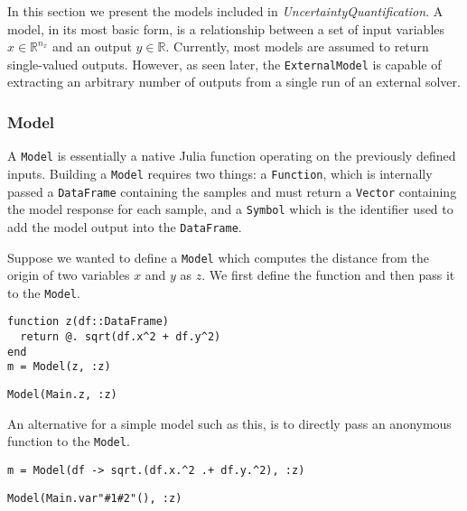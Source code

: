 In this section we present the models included in \emph{UncertaintyQuantification}. A model, in its most basic form, is a relationship between a set of input variables \(x \in \mathbb{R}^{n_x}\) and an output \(y \in \mathbb{R}\). Currently, most models are assumed to return single-valued outputs. However, as seen later, the \texttt{ExternalModel} is capable of extracting an arbitrary number of outputs from a single run of an external solver.



\subsubsection{Model}



\label{12360836855591423082}{}


A \texttt{Model} is essentially a native Julia function operating on the previously defined inputs. Building a \texttt{Model} requires two things: a \texttt{Function}, which is internally passed a \texttt{DataFrame} containing the samples and must return a \texttt{Vector} containing the model response for each sample, and a \texttt{Symbol} which is the identifier used to add the model output into the \texttt{DataFrame}.



Suppose we wanted to define a \texttt{Model} which computes the distance from the origin of two variables \(x\) and \(y\) as \(z\). We first define the function and then pass it to the \texttt{Model}.




\begin{verbatim}
function z(df::DataFrame)
  return @. sqrt(df.x^2 + df.y^2)
end
m = Model(z, :z)
\end{verbatim}


\begin{verbatim}
Model(Main.z, :z)
\end{verbatim}



An alternative for a simple model such as this, is to directly pass an anonymous function to the \texttt{Model}.




\begin{verbatim}
m = Model(df -> sqrt.(df.x.^2 .+ df.y.^2), :z)
\end{verbatim}


\begin{verbatim}
Model(Main.var"#1#2"(), :z)
\end{verbatim}



